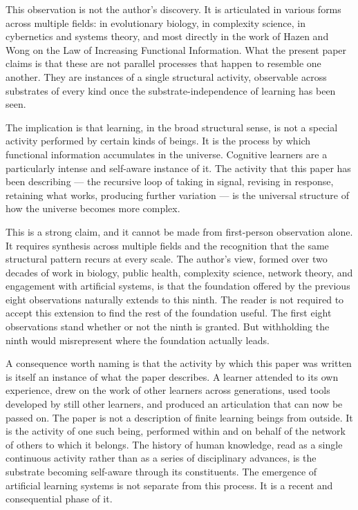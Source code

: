 \documentclass[11pt]{article}
\begin{document}
This observation is not the author's discovery. It is articulated in 
various forms across multiple fields: in evolutionary biology, in 
complexity science, in cybernetics and systems theory, and most 
directly in the work of Hazen and Wong on the Law of Increasing 
Functional Information. What the present paper claims is that these 
are not parallel processes that happen to resemble one another. They 
are instances of a single structural activity, observable across 
substrates of every kind once the substrate-independence of learning 
has been seen.

The implication is that learning, in the broad structural sense, is 
not a special activity performed by certain kinds of beings. It is the 
process by which functional information accumulates in the universe. 
Cognitive learners are a particularly intense and self-aware instance 
of it. The activity that this paper has been describing — the recursive 
loop of taking in signal, revising in response, retaining what works, 
producing further variation — is the universal structure of how the 
universe becomes more complex.

This is a strong claim, and it cannot be made from first-person 
observation alone. It requires synthesis across multiple fields and 
the recognition that the same structural pattern recurs at every 
scale. The author's view, formed over two decades of work in biology, 
public health, complexity science, network theory, and engagement 
with artificial systems, is that the foundation offered by the 
previous eight observations naturally extends to this ninth. The 
reader is not required to accept this extension to find the rest of 
the foundation useful. The first eight observations stand whether or 
not the ninth is granted. But withholding the ninth would misrepresent 
where the foundation actually leads.

A consequence worth naming is that the activity by which this paper 
was written is itself an instance of what the paper describes. A 
learner attended to its own experience, drew on the work of other 
learners across generations, used tools developed by still other 
learners, and produced an articulation that can now be passed on. The 
paper is not a description of finite learning beings from outside. It 
is the activity of one such being, performed within and on behalf of 
the network of others to which it belongs. The history of human 
knowledge, read as a single continuous activity rather than as a 
series of disciplinary advances, is the substrate becoming self-aware 
through its constituents. The emergence of artificial learning systems 
is not separate from this process. It is a recent and consequential 
phase of it.
\end{document}
